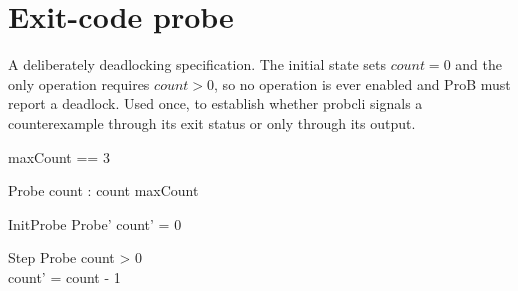 \documentclass{article}
\begin{document}
\section{Exit-code probe}

A deliberately deadlocking specification. The initial state sets $count = 0$
and the only operation requires $count > 0$, so no operation is ever enabled
and ProB must report a deadlock. Used once, to establish whether probcli
signals a counterexample through its exit status or only through its output.

\begin{zed}
  maxCount == 3
\end{zed}

\begin{schema}{Probe}
  count : \nat
\where
  count \leq maxCount
\end{schema}

\begin{schema}{InitProbe}
  Probe'
\where
  count' = 0
\end{schema}

\begin{schema}{Step}
  \Delta Probe
\where
  count > 0 \\
  count' = count - 1
\end{schema}
\end{document}
